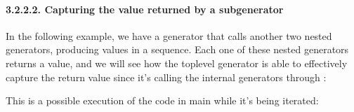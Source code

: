 \documentclass[a4paper,10pt,english]{sphinxmanual}
\begin{document}
\paragraph{3.2.2.2. Capturing the value returned by a sub\sphinxhyphen{}generator}
\label{\detokenize{chapters/7_generators/index:capturing-the-value-returned-by-a-sub-generator}}
In the following example, we have a generator that calls another two nested generators,
producing values in a sequence. Each one of these nested generators returns a value, and
we will see how the top\sphinxhyphen{}level generator is able to effectively capture the return value since
it’s calling the internal generators through :

\begin{sphinxVerbatim}[commandchars=\\\{\}]
   
      
     

 
         
         
       
\end{sphinxVerbatim}

This is a possible execution of the code in main while it’s being iterated:
\end{document}
